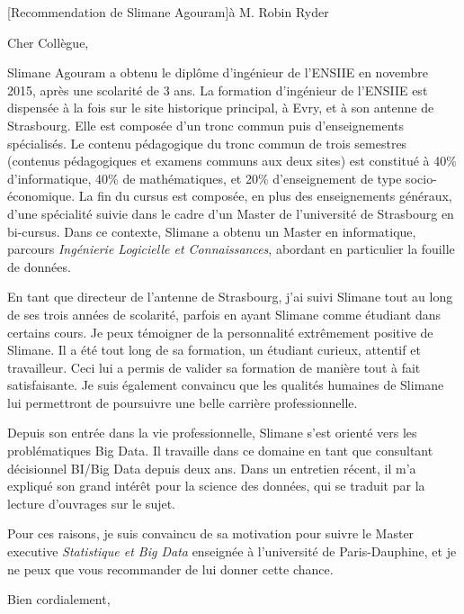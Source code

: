 \documentclass[a4paper,10pt]{article}
\begin{document}

\begin{letter}[Recommendation de Slimane Agouram]{à}%
{M. Robin Ryder}


Cher Collègue,


Slimane Agouram  a obtenu le diplôme  d'ingénieur de l'ENSIIE en  novembre 2015,
après une scolarité de 3 ans. La formation d'ingénieur de l'ENSIIE est dispensée
à  la fois  sur  le site  historique  principal, à  Evry, et  à  son antenne  de
Strasbourg.   Elle   est  composée   d'un  tronc  commun   puis  d'enseignements
spécialisés.   Le  contenu  pédagogique  du  tronc  commun  de  trois  semestres
(contenus pédagogiques et  examens communs aux deux sites) est  constitué à 40\%
d'informatique,  40\%   de  mathématiques,   et  20\%  d'enseignement   de  type
socio-économique. La fin du cursus est composée, en plus des enseignements
généraux, d'une spécialité suivie dans le cadre d'un Master de l'université de
Strasbourg en bi-cursus. Dans ce contexte, Slimane a obtenu un Master en
informatique, parcours \emph{Ingénierie Logicielle et Connaissances}, abordant
en particulier la fouille de données.

En tant  que directeur de  l'antenne de Strasbourg,  j'ai suivi Slimane  tout au
long de ses  trois années de scolarité, parfois en  ayant Slimane comme étudiant
dans certains cours.  Je peux  témoigner de la personnalité extrêmement positive
de Slimane. Il a été tout long de sa formation, un étudiant curieux, attentif et
travailleur. Ceci lui  a permis de valider  sa formation de manière  tout à fait
satisfaisante. Je suis également convaincu que les qualités humaines de Slimane
lui permettront de poursuivre une belle carrière professionnelle.

Depuis son  entrée dans la vie  professionnelle, Slimane s'est orienté  vers les
problématiques Big  Data. Il travaille  dans ce  domaine en tant  que consultant
décisionnel  BI/Big Data  depuis  deux ans.  Dans un  entretien  récent, il  m'a
expliqué son grand  intérêt pour la science  des données, qui se  traduit par la
lecture d'ouvrages sur le sujet.

Pour  ces raisons,  je suis  convaincu de  sa motivation  pour suivre  le Master
executive   \emph{Statistique  et   Big  Data}   enseignée  à   l'université  de
Paris-Dauphine, et je ne peux que vous recommander de lui donner cette chance.

Bien cordialement,

\end{letter}
\begin{flushright}
\end{flushright}
\end{document}
